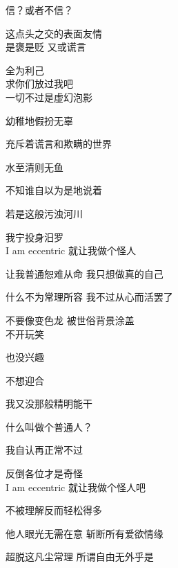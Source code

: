 信？或者不信？

这点头之交的表面友情
\\

是褒是贬 又或谎言

全为利己
\\

求你们放过我吧
\\

一切不过是虚幻泡影

幼稚地假扮无辜

充斥着谎言和欺瞒的世界

水至清则无鱼

不知谁自以为是地说着

若是这般污浊河川

我宁投身汨罗
\\

I am eccentric 就让我做个怪人

让我普通恕难从命 我只想做真的自己

什么不为常理所容 我不过从心而活罢了

不要像变色龙 被世俗背景涂盖
\\

不开玩笑

也没兴趣

不想迎合

我又没那般精明能干

什么叫做个普通人？

我自认再正常不过

反倒各位才是奇怪
\\

I am eccentric 就让我做个怪人吧

不被理解反而轻松得多

他人眼光无需在意 斩断所有爱欲情缘

超脱这凡尘常理 所谓自由无外乎是
\\
